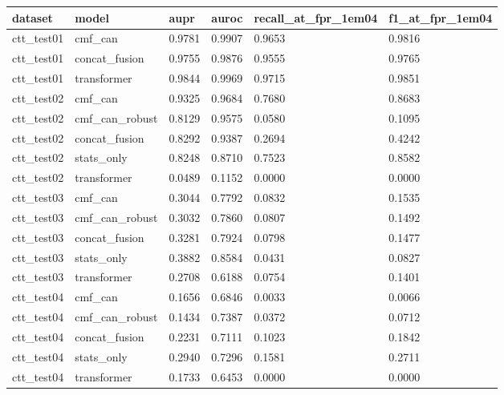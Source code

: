 \begin{tabular}{llllll}
\toprule
dataset & model & aupr & auroc & recall\_at\_fpr\_1em04 & f1\_at\_fpr\_1em04 \\
\midrule
ctt\_test01 & cmf\_can & 0.9781 & 0.9907 & 0.9653 & 0.9816 \\
ctt\_test01 & concat\_fusion & 0.9755 & 0.9876 & 0.9555 & 0.9765 \\
ctt\_test01 & transformer & 0.9844 & 0.9969 & 0.9715 & 0.9851 \\
ctt\_test02 & cmf\_can & 0.9325 & 0.9684 & 0.7680 & 0.8683 \\
ctt\_test02 & cmf\_can\_robust & 0.8129 & 0.9575 & 0.0580 & 0.1095 \\
ctt\_test02 & concat\_fusion & 0.8292 & 0.9387 & 0.2694 & 0.4242 \\
ctt\_test02 & stats\_only & 0.8248 & 0.8710 & 0.7523 & 0.8582 \\
ctt\_test02 & transformer & 0.0489 & 0.1152 & 0.0000 & 0.0000 \\
ctt\_test03 & cmf\_can & 0.3044 & 0.7792 & 0.0832 & 0.1535 \\
ctt\_test03 & cmf\_can\_robust & 0.3032 & 0.7860 & 0.0807 & 0.1492 \\
ctt\_test03 & concat\_fusion & 0.3281 & 0.7924 & 0.0798 & 0.1477 \\
ctt\_test03 & stats\_only & 0.3882 & 0.8584 & 0.0431 & 0.0827 \\
ctt\_test03 & transformer & 0.2708 & 0.6188 & 0.0754 & 0.1401 \\
ctt\_test04 & cmf\_can & 0.1656 & 0.6846 & 0.0033 & 0.0066 \\
ctt\_test04 & cmf\_can\_robust & 0.1434 & 0.7387 & 0.0372 & 0.0712 \\
ctt\_test04 & concat\_fusion & 0.2231 & 0.7111 & 0.1023 & 0.1842 \\
ctt\_test04 & stats\_only & 0.2940 & 0.7296 & 0.1581 & 0.2711 \\
ctt\_test04 & transformer & 0.1733 & 0.6453 & 0.0000 & 0.0000 \\
\bottomrule
\end{tabular}
